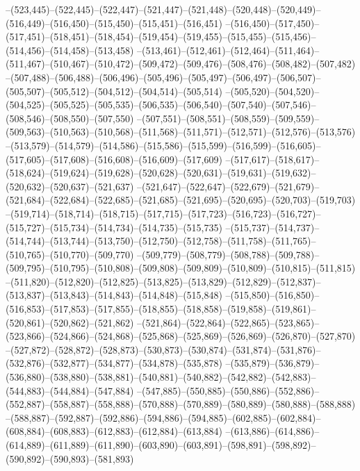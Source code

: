 --(523,445)--(522,445)--(522,447)--(521,447)--(521,448)--(520,448)--(520,449)--(516,449)--(516,450)--(515,450)--(515,451)--(516,451)
--(516,450)--(517,450)--(517,451)--(518,451)--(518,454)--(519,454)--(519,455)--(515,455)--(515,456)--(514,456)--(514,458)--(513,458)
--(513,461)--(512,461)--(512,464)--(511,464)--(511,467)--(510,467)--(510,472)--(509,472)--(509,476)--(508,476)--(508,482)--(507,482)
--(507,488)--(506,488)--(506,496)--(505,496)--(505,497)--(506,497)--(506,507)--(505,507)--(505,512)--(504,512)--(504,514)--(505,514)
--(505,520)--(504,520)--(504,525)--(505,525)--(505,535)--(506,535)--(506,540)--(507,540)--(507,546)--(508,546)--(508,550)--(507,550)
--(507,551)--(508,551)--(508,559)--(509,559)--(509,563)--(510,563)--(510,568)--(511,568)--(511,571)--(512,571)--(512,576)--(513,576)
--(513,579)--(514,579)--(514,586)--(515,586)--(515,599)--(516,599)--(516,605)--(517,605)--(517,608)--(516,608)--(516,609)--(517,609)
--(517,617)--(518,617)--(518,624)--(519,624)--(519,628)--(520,628)--(520,631)--(519,631)--(519,632)--(520,632)--(520,637)--(521,637)
--(521,647)--(522,647)--(522,679)--(521,679)--(521,684)--(522,684)--(522,685)--(521,685)--(521,695)--(520,695)--(520,703)--(519,703)
--(519,714)--(518,714)--(518,715)--(517,715)--(517,723)--(516,723)--(516,727)--(515,727)--(515,734)--(514,734)--(514,735)--(515,735)
--(515,737)--(514,737)--(514,744)--(513,744)--(513,750)--(512,750)--(512,758)--(511,758)--(511,765)--(510,765)--(510,770)--(509,770)
--(509,779)--(508,779)--(508,788)--(509,788)--(509,795)--(510,795)--(510,808)--(509,808)--(509,809)--(510,809)--(510,815)--(511,815)
--(511,820)--(512,820)--(512,825)--(513,825)--(513,829)--(512,829)--(512,837)--(513,837)--(513,843)--(514,843)--(514,848)--(515,848)
--(515,850)--(516,850)--(516,853)--(517,853)--(517,855)--(518,855)--(518,858)--(519,858)--(519,861)--(520,861)--(520,862)--(521,862)
--(521,864)--(522,864)--(522,865)--(523,865)--(523,866)--(524,866)--(524,868)--(525,868)--(525,869)--(526,869)--(526,870)--(527,870)
--(527,872)--(528,872)--(528,873)--(530,873)--(530,874)--(531,874)--(531,876)--(532,876)--(532,877)--(534,877)--(534,878)--(535,878)
--(535,879)--(536,879)--(536,880)--(538,880)--(538,881)--(540,881)--(540,882)--(542,882)--(542,883)--(544,883)--(544,884)--(547,884)
--(547,885)--(550,885)--(550,886)--(552,886)--(552,887)--(558,887)--(558,888)--(570,888)--(570,889)--(580,889)--(580,888)--(588,888)
--(588,887)--(592,887)--(592,886)--(594,886)--(594,885)--(602,885)--(602,884)--(608,884)--(608,883)--(612,883)--(612,884)--(613,884)
--(613,886)--(614,886)--(614,889)--(611,889)--(611,890)--(603,890)--(603,891)--(598,891)--(598,892)--(590,892)--(590,893)--(581,893)
